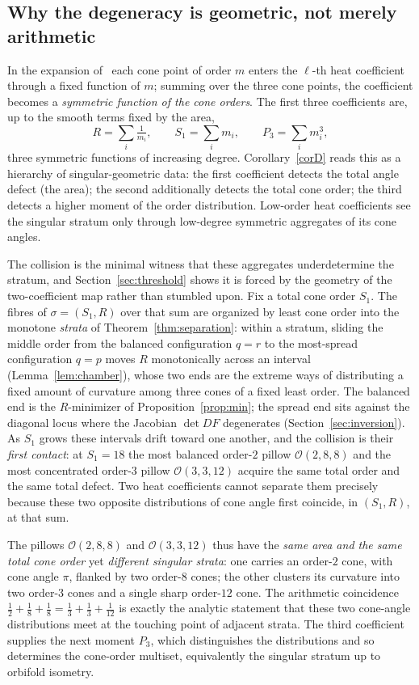 \documentclass[12pt, letterpaper]{article}
\theoremstyle{definition}
\theoremstyle{plain}
\begin{document}
\subsection{Why the degeneracy is geometric, not merely arithmetic}

In the expansion of~\cite{dggw2008} each cone point of order $m$ enters the $\ell$-th heat coefficient through a fixed function of $m$; summing over the three cone points, the coefficient becomes a \emph{symmetric function of the cone orders}. The first three coefficients are, up to the smooth terms fixed by the area,
\[
    R=\sum_i \tfrac1{m_i},\qquad S_1=\sum_i m_i,\qquad P_3=\sum_i m_i^{3},
\]
three symmetric functions of increasing degree. Corollary~\ref{corD} reads this as a hierarchy of singular-geometric data: the first coefficient detects the total angle defect (the area); the second additionally detects the total cone order; the third detects a higher moment of the order distribution. Low-order heat coefficients see the singular stratum only through low-degree symmetric aggregates of its cone angles.

The collision is the minimal witness that these aggregates underdetermine the stratum, and Section~\ref{sec:threshold} shows it is forced by the geometry of the two-coefficient map rather than stumbled upon. Fix a total cone order $S_1$. The fibres of $\sigma=(S_1,R)$ over that sum are organized by least cone order into the monotone \emph{strata} of Theorem~\ref{thm:separation}: within a stratum, sliding the middle order from the balanced configuration $q=r$ to the most-spread configuration $q=p$ moves $R$ monotonically across an interval (Lemma~\ref{lem:chamber}), whose two ends are the extreme ways of distributing a fixed amount of curvature among three cones of a fixed least order. The balanced end is the $R$-minimizer of Proposition~\ref{prop:min}; the spread end sits against the diagonal locus where the Jacobian $\det DF$ degenerates (Section~\ref{sec:inversion}). As $S_1$ grows these intervals drift toward one another, and the collision is their \emph{first contact}: at $S_1=18$ the most balanced order-$2$ pillow $\mathcal{O}(2,8,8)$ and the most concentrated order-$3$ pillow $\mathcal{O}(3,3,12)$ acquire the same total order and the same total defect. Two heat coefficients cannot separate them precisely because these two opposite distributions of cone angle first coincide, in $(S_1,R)$, at that sum.

The pillows $\mathcal{O}(2,8,8)$ and $\mathcal{O}(3,3,12)$ thus have the \emph{same area and the same total cone order} yet \emph{different singular strata}: one carries an order-$2$ cone, with cone angle $\pi$, flanked by two order-$8$ cones; the other clusters its curvature into two order-$3$ cones and a single sharp order-$12$ cone. The arithmetic coincidence $\tfrac12+\tfrac18+\tfrac18=\tfrac13+\tfrac13+\tfrac1{12}$ is exactly the analytic statement that these two cone-angle distributions meet at the touching point of adjacent strata. The third coefficient supplies the next moment $P_3$, which distinguishes the distributions and so determines the cone-order multiset, equivalently the singular stratum up to orbifold isometry.
\end{document}
